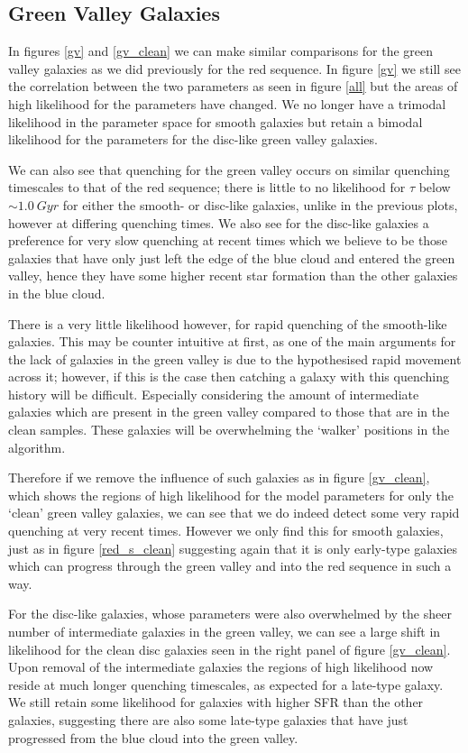 \documentclass{mn2e}
\begin{document}
\subsection{Green Valley Galaxies}


In figures \ref{gv} and \ref{gv_clean} we can make similar comparisons for the green valley galaxies as we did previously for the red sequence. In figure \ref{gv} we still see the correlation between the two parameters as seen in figure \ref{all} but the areas of high likelihood for the parameters have changed. We no longer have a trimodal likelihood in the parameter space for smooth galaxies but retain a bimodal likelihood for the parameters for the disc-like green valley galaxies. 

We can also see that quenching for the green valley occurs on similar quenching timescales to that of the red sequence; there is little to no likelihood for $\tau$ below $\sim 1.0 ~Gyr$ for either the smooth- or disc-like galaxies, unlike in the previous plots, however at differing quenching times. We also see for the disc-like galaxies a preference for very slow quenching at recent times which we believe to be those galaxies that have only just left the edge of the blue cloud and entered the green valley, hence they have some higher recent star formation than the other galaxies in the blue cloud.

There is a very little likelihood however, for rapid quenching of the smooth-like galaxies. This may be counter intuitive at first, as one of the main arguments for the lack of galaxies in the green valley is due to the hypothesised rapid movement across it; however, if this is the case then catching a galaxy with this quenching history will be difficult. Especially considering the amount of intermediate galaxies which are present in the green valley compared to those that are in the clean samples. These galaxies will be overwhelming the `walker' positions in the algorithm. 

Therefore if we remove the influence of such galaxies as in figure \ref{gv_clean}, which shows the regions of high likelihood for the model parameters for only the `clean' green valley galaxies, we can see that we do indeed detect some very rapid quenching at very recent times. However we only find this for smooth galaxies, just as in figure \ref{red_s_clean} suggesting again that it is only early-type galaxies which can progress through the green valley and into the red sequence in such a way. 

For the disc-like galaxies, whose parameters were also overwhelmed by the sheer number of intermediate galaxies in the green valley, we can see a large shift in likelihood for the clean disc galaxies seen in the right panel of figure \ref{gv_clean}. Upon removal of the intermediate galaxies the regions of high likelihood now reside at much longer quenching timescales, as expected for a late-type galaxy.  We still retain some likelihood for galaxies with higher SFR than the other galaxies, suggesting there are also some late-type galaxies that have just progressed from the blue cloud into the green valley. 
\end{document}
